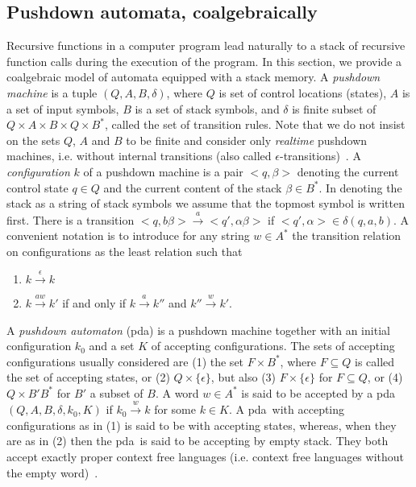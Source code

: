 \documentclass{LMCS}
\begin{document}
\subsection{Pushdown automata, coalgebraically}\label{pda}
\newcommand\pda{{\sc pda}}

Recursive functions in a computer program lead naturally to a stack of recursive function
calls during the execution of the program. In this section, we provide a coalgebraic model
of automata equipped with a stack memory. A \emph{pushdown machine} is a tuple $(Q,A,B,\delta)$,
where $Q$ is set of control locations (states), $A$ is a set of input symbols, $B$ is a set of stack symbols,
and $\delta$ is finite subset of $Q \times A \times B \times Q \times B^*$, called the set of
transition rules. Note that we do not insist on the sets $Q$, $A$ and $B$ to be finite and
consider only \emph{realtime} pushdown machines, i.e. without internal
transitions (also called $\epsilon$-transitions)~\cite{HU79}. A {\em configuration} $k$
of a pushdown machine  is a pair $<q,\beta>$ denoting the current control state
$q \in Q$ and the current content of the stack $\beta \in B^*$. In denoting the
stack as a string of stack symbols we assume that the topmost symbol is written
first. There is a transition $<q,b\beta> \xrightarrow {a} <q',\alpha\beta>$ if $<q',\alpha> \in \delta(q,a,b)$.
A convenient notation is to introduce for any string $w \in A^*$ the transition relation on configurations
as the least relation such that
\begin{enumerate}[(1)]
\item $k \xrightarrow {\epsilon} k$
\item $k \xrightarrow {aw} k'$ if and only if $k \xrightarrow {a} k''$ and $k'' \xrightarrow {w} k'$.
\end{enumerate}
A \emph{pushdown automaton} (\pda) is a pushdown machine together with an initial configuration $k_0$ and a
set $K$ of accepting configurations. The sets of accepting configurations usually considered are
(1)  the set $F \times B^*$, where $F \subseteq Q$ is called the set of accepting states, or
(2) $Q \times \{ \epsilon \}$, but also (3) $F \times \{ \epsilon \}$ for $F \subseteq Q$, or
(4) $Q \times B'B^*$ for $B'$ a subset of $B$.
A word $w \in A^*$ is said to be accepted by  a \pda\ $(Q,A,B,\delta,k_0,K)$ if
$k_0  \xrightarrow {w} k$  for some $k \in K$. A \pda\ with accepting configurations as in (1)
is said to be with accepting states, whereas, when they are as in (2) then the \pda\ is said to be 
accepting by empty stack. They both accept exactly proper context free languages (i.e. context 
free languages without the empty word)~\cite{ABB97}. 
\end{document}
